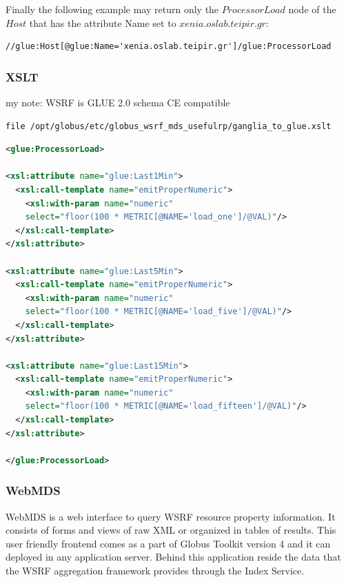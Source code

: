 Finally the following example may return only the $ProcessorLoad$ node of the $Host$ that has the attribute Name set to $xenia.oslab.teipir.gr$:
\begin{verbatim}
//glue:Host[@glue:Name='xenia.oslab.teipir.gr']/glue:ProcessorLoad
\end{verbatim}


\subsubsection{XSLT}
my note: WSRF is GLUE 2.0 schema CE compatible
\begin{verbatim}
file /opt/globus/etc/globus_wsrf_mds_usefulrp/ganglia_to_glue.xslt
\end{verbatim}

\begin{lstlisting}[language=XML,caption=WSRF XSLT for Ganglia Information Provider]
<glue:ProcessorLoad>

<xsl:attribute name="glue:Last1Min">
  <xsl:call-template name="emitProperNumeric">
    <xsl:with-param name="numeric" 
    select="floor(100 * METRIC[@NAME='load_one']/@VAL)"/>
  </xsl:call-template>
</xsl:attribute>

<xsl:attribute name="glue:Last5Min">
  <xsl:call-template name="emitProperNumeric">
    <xsl:with-param name="numeric" 
    select="floor(100 * METRIC[@NAME='load_five']/@VAL)"/>
  </xsl:call-template>
</xsl:attribute>

<xsl:attribute name="glue:Last15Min">
  <xsl:call-template name="emitProperNumeric">
    <xsl:with-param name="numeric" 
    select="floor(100 * METRIC[@NAME='load_fifteen']/@VAL)"/>
  </xsl:call-template>
</xsl:attribute>

</glue:ProcessorLoad>
\end{lstlisting}

\subsubsection{WebMDS}
WebMDS is a web interface to query WSRF resource property information. It consists of forms and views of raw XML or organized in tables of results. This user friendly frontend comes as a part of Globus Toolkit version 4 and it can deployed in any application server. Behind this application reside the data that the WSRF aggregation framework provides through the Index Service.

